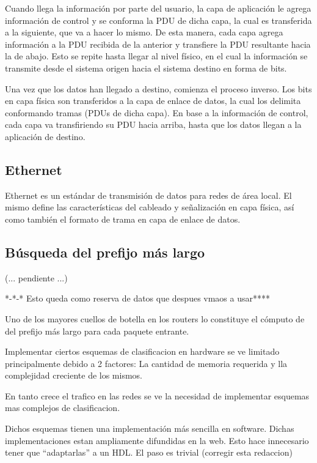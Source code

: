 Cuando llega la información por parte del usuario, la capa de aplicación le agrega información de control y se conforma la PDU de dicha capa, la cual es transferida a la siguiente, que va a hacer lo mismo. De esta manera, cada capa agrega información a la PDU recibida de la anterior y transfiere la PDU resultante hacia la de abajo. Esto se repite hasta llegar al nivel físico, en el cual la información se transmite desde el sistema origen hacia el sistema destino en forma de bits.

Una vez que los datos han llegado a destino, comienza el proceso inverso. Los bits en capa física son transferidos a la capa de enlace de datos, la cual los delimita conformando tramas (PDUs de dicha capa). En base a la información de control, cada capa va transfiriendo su PDU hacia arriba, hasta que los datos llegan a la aplicación de destino.

\subsection{Ethernet}

Ethernet es un estándar de transmisión de datos para redes de área local. El mismo define las características del cableado y señalización en capa física, así como también el formato de trama en capa de enlace de datos.



\subsection{Búsqueda del prefijo más largo}

(... pendiente ...)


*-*-* Esto queda como reserva de datos que despues vmaos a usar****

Uno de los mayores cuellos de botella en los routers lo constituye el cómputo de del prefijo más largo para cada paquete entrante.

Implementar ciertos esquemas de clasificacion en hardware se ve limitado principalmente debido a 2 factores: La cantidad de memoria requerida y lla complejidad creciente de los mismos.

En tanto crece el trafico en las redes se ve la necesidad de implementar esquemas mas complejos de clasificacion.

Dichos esquemas tienen una implementación más sencilla en software. Dichas implementaciones estan ampliamente difundidas en la web.
Esto hace innecesario tener que “adaptarlas” a un HDL. El paso es trivial (corregir esta redaccion)

